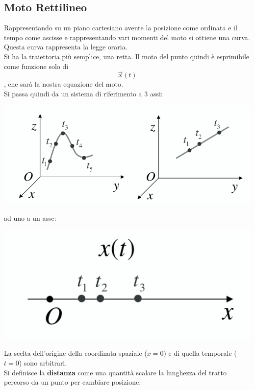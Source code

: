 \documentclass[a4paper,12pt, oneside]{book}
\begin{document}
\subsection{Moto Rettilineo}
Rappresentando su un piano cartesiano avente la posizione come ordinata e il tempo come ascisse e rappresentando vari momenti del moto si ottiene una curva. Questa curva rappresenta la legge oraria.\\
Si ha la traiettoria più semplice, una retta. Il moto del punto quindi è esprimibile come funzione solo di $$\vec{x}(t)$$, che sarà la nostra equazione del moto.\\
Si passa quindi da un sistema di riferimento a 3 assi:
\begin{center}
\includegraphics[scale=0.5]{img/rett.png}
\end{center}
ad uno a un asse:
\begin{center}
\includegraphics[scale=0.3]{img/ret2.png}
\end{center}
La scelta dell'origine della coordinata spaziale ($x=0$) e di quella temporale ($t=0$) sono arbitrari.\\
Si definisce la \textbf{distanza} come una quantità scalare la lunghezza del tratto percorso da un punto per cambiare posizione.
\end{document}
